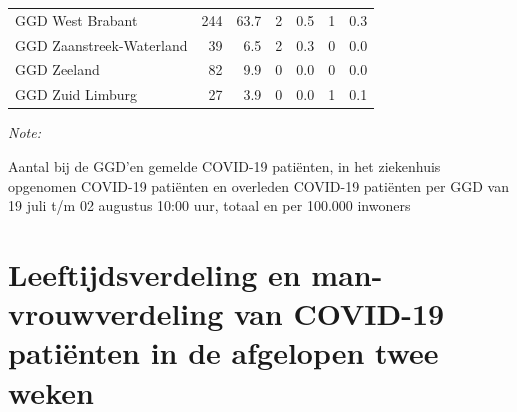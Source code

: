\documentclass[
  english,
  man,floatsintext]{apa6}
\begin{document}
\begin{table}[H]
\begin{threeparttable}
\begin{tabular}{lrrrrrr}
GGD West Brabant & 244 & 63.7 & 2 & 0.5 & 1 & 0.3\\
GGD Zaanstreek-Waterland & 39 & 6.5 & 2 & 0.3 & 0 & 0.0\\
GGD Zeeland & 82 & 9.9 & 0 & 0.0 & 0 & 0.0\\
GGD Zuid Limburg & 27 & 3.9 & 0 & 0.0 & 1 & 0.1\\
\bottomrule
\end{tabular}
\begin{tablenotes}
\item \textit{Note: } 
\item Aantal bij de GGD’en gemelde COVID-19 patiënten, in het ziekenhuis opgenomen COVID-19 patiënten en overleden COVID-19 patiënten per GGD van 19 juli t/m 02 augustus 10:00 uur, totaal en per 100.000 inwoners
\end{tablenotes}
\end{threeparttable}
\endgroup{}
\end{table}

\newpage

\hypertarget{leeftijdsverdeling-en-man-vrouwverdeling-van-covid-19-patiuxebnten-in-de-afgelopen-twee-weken}{%
\section{Leeftijdsverdeling en man-vrouwverdeling van COVID-19 patiënten in de afgelopen twee weken}\label{leeftijdsverdeling-en-man-vrouwverdeling-van-covid-19-patiuxebnten-in-de-afgelopen-twee-weken}}
\end{document}
